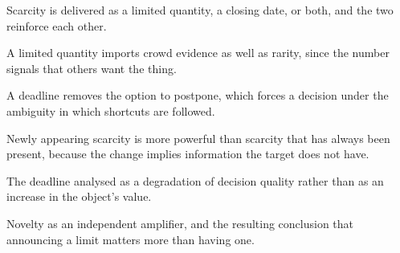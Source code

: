 

\begin{distilled}
  \item Scarcity is delivered as a limited quantity, a closing date, or both, and the two reinforce each other.
  \item A limited quantity imports crowd evidence as well as rarity, since the number signals that others want the thing.
  \item A deadline removes the option to postpone, which forces a decision under the ambiguity in which shortcuts are followed.
  \item Newly appearing scarcity is more powerful than scarcity that has always been present, because the change implies information the target does not have.
\end{distilled}

\begin{unique}
  \item The deadline analysed as a degradation of decision quality rather than as an increase in the object's value.
  \item Novelty as an independent amplifier, and the resulting conclusion that announcing a limit matters more than having one.
\end{unique}
